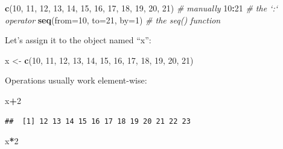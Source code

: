 \documentclass[]{book}
\newenvironment{Shaded}{\begin{snugshade}}{\end{snugshade}}
\newcommand{\KeywordTok}[1]{\textcolor[rgb]{0.13,0.29,0.53}{\textbf{#1}}}
\newcommand{\DataTypeTok}[1]{\textcolor[rgb]{0.13,0.29,0.53}{#1}}
\newcommand{\DecValTok}[1]{\textcolor[rgb]{0.00,0.00,0.81}{#1}}
\newcommand{\StringTok}[1]{\textcolor[rgb]{0.31,0.60,0.02}{#1}}
\newcommand{\CommentTok}[1]{\textcolor[rgb]{0.56,0.35,0.01}{\textit{#1}}}
\newcommand{\OperatorTok}[1]{\textcolor[rgb]{0.81,0.36,0.00}{\textbf{#1}}}
\newcommand{\NormalTok}[1]{#1}
\theoremstyle{definition}
\theoremstyle{definition}
\theoremstyle{definition}
\theoremstyle{remark}
\begin{document}
\begin{Shaded}
\begin{Highlighting}[]
\KeywordTok{c}\NormalTok{(}\DecValTok{10}\NormalTok{, }\DecValTok{11}\NormalTok{, }\DecValTok{12}\NormalTok{, }\DecValTok{13}\NormalTok{, }\DecValTok{14}\NormalTok{, }\DecValTok{15}\NormalTok{, }\DecValTok{16}\NormalTok{, }\DecValTok{17}\NormalTok{, }\DecValTok{18}\NormalTok{, }\DecValTok{19}\NormalTok{, }\DecValTok{20}\NormalTok{, }\DecValTok{21}\NormalTok{) }\CommentTok{# manually}
\DecValTok{10}\OperatorTok{:}\DecValTok{21} \CommentTok{# the `:` operator                            }
\KeywordTok{seq}\NormalTok{(}\DataTypeTok{from=}\DecValTok{10}\NormalTok{, }\DataTypeTok{to=}\DecValTok{21}\NormalTok{, }\DataTypeTok{by=}\DecValTok{1}\NormalTok{) }\CommentTok{# the seq() function}
\end{Highlighting}
\end{Shaded}

Let's assign it to the object named ``x'':

\begin{Shaded}
\begin{Highlighting}[]
\NormalTok{x <-}\StringTok{ }\KeywordTok{c}\NormalTok{(}\DecValTok{10}\NormalTok{, }\DecValTok{11}\NormalTok{, }\DecValTok{12}\NormalTok{, }\DecValTok{13}\NormalTok{, }\DecValTok{14}\NormalTok{, }\DecValTok{15}\NormalTok{, }\DecValTok{16}\NormalTok{, }\DecValTok{17}\NormalTok{, }\DecValTok{18}\NormalTok{, }\DecValTok{19}\NormalTok{, }\DecValTok{20}\NormalTok{, }\DecValTok{21}\NormalTok{)  }
\end{Highlighting}
\end{Shaded}

Operations usually work element-wise:

\begin{Shaded}
\begin{Highlighting}[]
\NormalTok{x}\OperatorTok{+}\DecValTok{2}
\end{Highlighting}
\end{Shaded}

\begin{verbatim}
##  [1] 12 13 14 15 16 17 18 19 20 21 22 23
\end{verbatim}

\begin{Shaded}
\begin{Highlighting}[]
\NormalTok{x}\OperatorTok{*}\DecValTok{2}    
\end{Highlighting}
\end{Shaded}
\end{document}
